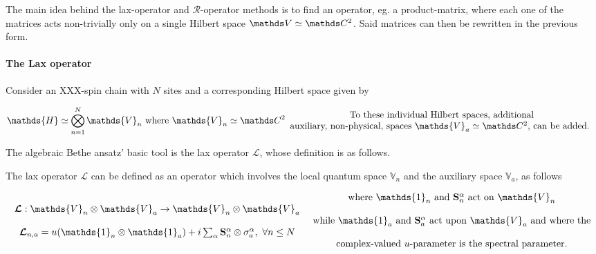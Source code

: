 \documentclass{homework}
\begin{document}
The main idea behind the lax-operator and $\bm{\mathcal{R}}$-operator methods is to find an operator, eg. a product-matrix, where each one of the matrices acts non-trivially only on a single Hilbert space $\vds \simeq \ctwo$. Said matrices can then be rewritten in the previous form. \\

\paragraph{\textbf{The Lax operator}} Consider an XXX-spin chain with $N$ sites and a corresponding Hilbert space given by 

\begin{align}
    \mathds{H} \simeq \bigotimes_{n=1}^{N} {\mathds{V}_n} \textnormal{ where } {\mathds{V}_n} \simeq \ctwo \begin{array}{c}
         \textnormal{To these individual Hilbert spaces, additional}  \\
         \textnormal{auxiliary, non-physical, spaces $\mathds{V}_a \simeq \ctwo$, can be added. } \\
    \end{array}
\end{align}

The algebraic Bethe ansatz' basic tool is the lax operator $\bm{\mathcal{L}}$, whose definition is as follows. 

\begin{df}
   The lax operator $\bm{\mathcal{L}}$ can be defined as an operator which involves the local quantum space $\mathds{V}_n$ and the auxiliary space $\mathds{V}_a$, as follows 

\begin{equation}
    \begin{array}{c}
         \bm{\mathcal{L}} : \mathds{V}_n \otimes \mathds{V}_a \rightarrow \mathds{V}_n \otimes \mathds{V}_a \\
         \\
         \bm{\mathcal{L}}_{n, a} = u(\mathds{1}_n \otimes \mathds{1}_a) + i \sum_{\alpha} \spin_n^\alpha \otimes \sigma_{a}^\alpha, \blanky \forall n \leq N \\
    \end{array} \begin{array}{c}
         \textnormal{ where $\mathds{1}_n$ and $\spin_n^\alpha$ act on $\mathds{V}_n $} \\
         \\
         \textnormal{ while $\mathds{1}_a$ and $\spin_a^\alpha$ act upon $\mathds{V}_a$ and where the}\\
         \\
         \textnormal{ complex-valued $u$-parameter is the spectral parameter.}
    \end{array}
    \label{lax operator}
\end{equation}
\end{df}
\end{document}
